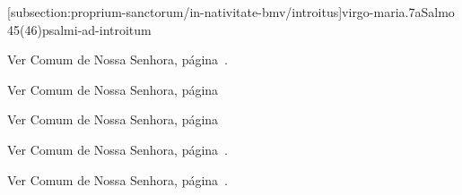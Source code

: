 \def\Prefix{subsection:proprium-sanctorum/in-nativitate-bmv}

[\Prefix/introitus]{virgo-maria.7a}{Salmo 45(46)}{psalmi-ad-introitum}

\begin{rubrica}
  Ver Comum de Nossa Senhora, página~\pageref{subsection:communia/commune-bmv/psalmus-responsorius}.
\end{rubrica}

\begin{rubrica}
  Ver Comum de Nossa Senhora, página~\pageref{subsection:communia/commune-bmv/alleluia}
\end{rubrica}

\begin{rubrica}
  Ver Comum de Nossa Senhora, página~\pageref{subsection:communia/commune-bmv/psalmus-alleluiaticus}
\end{rubrica}

\begin{rubrica}
  Ver Comum de Nossa Senhora, página~\pageref{subsection:communia/commune-bmv/offertorium}.
\end{rubrica}

\begin{rubrica}
  Ver Comum de Nossa Senhora, página~\pageref{subsection:communia/commune-bmv/communio-1}.
\end{rubrica}

\AllowPageFlush